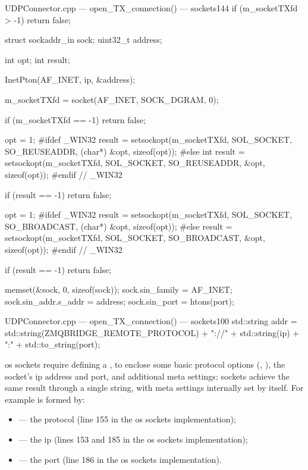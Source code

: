 \begin{codelist}{UDPConnector.cpp --- open\_TX\_connection() ---  sockets}{144}
    if (m_socketTXfd > -1)
        return false;

    struct sockaddr_in sock;
    uint32_t address;

    int opt;
    int result;

    InetPton(AF_INET, ip, &address);

    m_socketTXfd = socket(AF_INET, SOCK_DGRAM, 0);

    if (m_socketTXfd == -1) {
        return false;
    }

    opt = 1;
#ifdef _WIN32
    result = setsockopt(m_socketTXfd, SOL_SOCKET, SO_REUSEADDR, (char*) &opt, sizeof(opt));
#else
    int result = setsockopt(m_socketTXfd, SOL_SOCKET, SO_REUSEADDR, &opt, sizeof(opt));
#endif  // _WIN32

    if (result == -1) {
        return false;
    }

    opt = 1;
#ifdef _WIN32
    result = setsockopt(m_socketTXfd, SOL_SOCKET, SO_BROADCAST, (char*) &opt, sizeof(opt));
#else
    result = setsockopt(m_socketTXfd, SOL_SOCKET, SO_BROADCAST, &opt, sizeof(opt));
#endif  // _WIN32

    if (result == -1) {
        return false;
    }

    memset(&sock, 0, sizeof(sock));
    sock.sin_family      = AF_INET;
    sock.sin_addr.s_addr = address;
    sock.sin_port        = htons(port);
\end{codelist}

\begin{codelist}{UDPConnector.cpp --- open\_TX\_connection() ---  sockets}{100}
	std::string addr = std::string(ZMQBRIDGE_REMOTE_PROTOCOL) + "://" + std::string(ip) + ":" + std::to_string(port);
\end{codelist}

\FLOATnoindent \gls{os} sockets require defining a , to enclose some basic protocol options (, ), the socket's \gls{ip} address and port, and additional meta settings;  sockets achieve the same result through a single string, with meta settings internally set by  itself. For example  is formed by:

\begin{itemize}
	\item {} --- the protocol (line \num{155} in the \gls{os} sockets implementation);
	\item {} --- the \gls{ip} (lines \num{153} and \num{185} in the \gls{os} sockets implementation);
	\item {} --- the port (line \num{186} in the \gls{os} sockets implementation).
\end{itemize}

